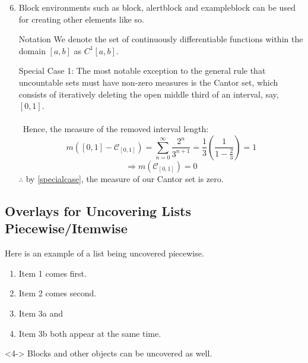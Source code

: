 \begin{frame}
\begin{enumerate}
\setcounter{enumi}{5}
\item Block environments such as {\yellow block}, {\red alertblock} and {\green exampleblock} can be used for creating other elements like so.
\begin{alertblock}{Notation}
    We denote the set of continuously differentiable functions within the domain $[a,b]$ as $C^1[a,b]$.
\end{alertblock}
\begin{exampleblock}{Special Case 1:}
    The most notable exception to the general rule that uncountable sets must have non-zero measures is the \alert{Cantor set}, which consists of iteratively deleting the open middle third of an interval, say, $[0,1]$.
    \\~\\\
    Hence, the measure of the removed interval length:
    \begin{equation}\label{specialcase}
        m\left([0,1]-\mathcal{C}_{[0,1]}\right)=\sum_{n=0}^\infty\frac{2^n}{3^{n+1}}
        =\frac{1}{3}\left(\frac{1}{1-\frac{2}{3}}\right)=1\tag{SC1}
    \end{equation}
    \[\Rightarrow m\left(\mathcal{C}_{[0,1]}\right)=0\]
    $\therefore$ by \eqref{specialcase}, the measure of our Cantor set is zero.
\end{exampleblock}
\end{enumerate}    
\end{frame}

\subsection{Overlays for Uncovering Lists Piecewise/Itemwise}

\begin{frame}
    Here is an example of a list being uncovered piecewise.
\begin{enumerate}
    \item<1-> Item 1 comes first.
    \item<2-> Item 2 comes second.
    \item<3-> Item 3a and
    \item<3-> Item 3b both appear at the same time.
\end{enumerate}
\begin{remark}<4->
    Blocks and other objects can be uncovered as well.
\end{remark}
\end{frame}


